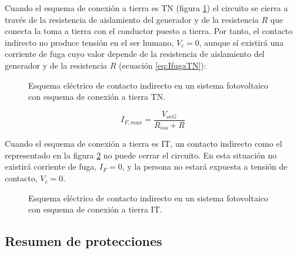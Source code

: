 Cuando el esquema de conexión a tierra es TN (figura \ref{fig:ContactoIndirectoTN})
el circuito se cierra a través de la resistencia de aislamiento del
generador y de la resistencia $R$ que conecta la toma a tierra con
el conductor puesto a tierra. Por tanto, el contacto indirecto no
produce tensión en el ser humano, $V_{c}=0$, aunque sí existirá una
corriente de fuga cuyo valor depende de la resistencia de aislamiento
del generador y de la resistencia $R$ (ecuación \ref{eq:IfugaTN}):

%
\begin{figure}
\hfill{}\hfill{}\hfill{}

\caption{Esquema eléctrico de contacto indirecto en un sistema fotovoltaico
con esquema de conexión a tierra TN.\label{fig:ContactoIndirectoTN}}

\end{figure}


\begin{equation}
I_{F,max}=\frac{V_{ocG}}{R_{iso}+R}\label{eq:IfugaTN}\end{equation}


Cuando el esquema de conexión a tierra es IT, un contacto indirecto
como el representado en la figura \ref{fig:ContactoIndirectoIT} no
puede cerrar el circuito. En esta situación no existirá corriente
de fuga, $I_{F}=0$, y la persona no estará expuesta a tensión de
contacto, $V_{c}=0$.

%
\begin{figure}
\hfill{}\hfill{}\hfill{}

\caption{Esquema eléctrico de contacto indirecto en un sistema fotovoltaico
con esquema de conexión a tierra IT.\label{fig:ContactoIndirectoIT}}

\end{figure}



\subsection{Resumen de protecciones}

